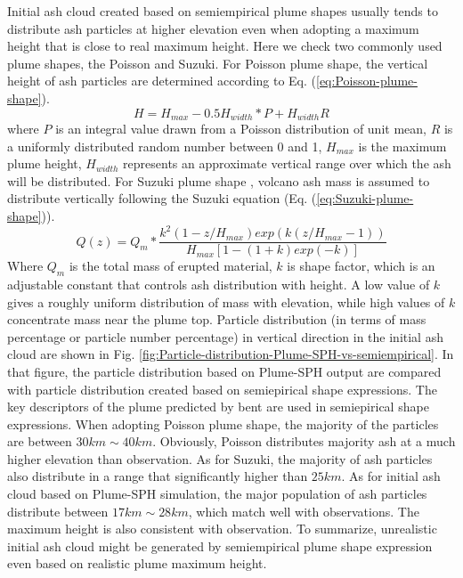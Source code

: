 Initial ash cloud created based on semiempirical plume shapes usually tends to distribute ash particles at higher elevation even when adopting a maximum height that is close to real maximum height. Here we check two commonly used plume shapes, the Poisson and Suzuki.
For Poisson plume shape, the vertical height of ash particles are determined according to Eq. (\ref{eq:Poisson-plume-shape}).
\begin{equation}
H=H_{max} - 0.5 H_{width}*P+H_{width}R
\label{eq:Poisson-plume-shape}
\end{equation}
where $P$ is an integral value drawn from a Poisson
distribution of unit mean, $R$ is a uniformly distributed random number between 0 and 1, $H_{max}$ is the maximum plume height, $H_{width}$ represents an approximate vertical range over which the ash will be distributed.
For Suzuki plume shape \citep{suzuki1983theoretical}, volcano ash mass is assumed to distribute vertically following the Suzuki equation (Eq. (\ref{eq:Suzuki-plume-shape})).
\begin{equation}
Q(z)=Q_m* \frac{k^2(1-z/H_{max})exp\left(k(z/H_{max} -1 )\right)}{H_{max}\left[1-(1+k)exp(-k)\right]}
\label{eq:Suzuki-plume-shape}
\end{equation}
Where $Q_m$ is the total mass of erupted material, $k$ is shape factor, which is an adjustable constant that controls ash distribution with height. A low value of $k$ gives a roughly uniform distribution of mass with elevation, while high values of $k$ concentrate mass near the plume top.
Particle distribution (in terms of mass percentage or particle number percentage) in vertical direction in the initial ash cloud are shown in Fig. \ref{fig:Particle-distribution-Plume-SPH-vs-semiempirical}. In that figure, the particle distribution based on Plume-SPH output are compared with particle distribution created based on semiepirical shape expressions. The key descriptors of the plume predicted by bent are used in semiepirical shape expressions. When adopting Poisson plume shape, the majority of the particles are between $30 km \sim 40 km$. Obviously, Poisson distributes majority ash at a much higher elevation than observation. As for Suzuki, the majority of ash particles also distribute in a range that significantly higher than $25 km$. As for initial ash cloud based on Plume-SPH simulation, the major population of ash particles distribute between $17 km \sim 28 km$, which match well with observations. The maximum height is also consistent with observation. To summarize, unrealistic initial ash cloud might be generated by semiempirical plume shape expression even based on realistic plume maximum height.

